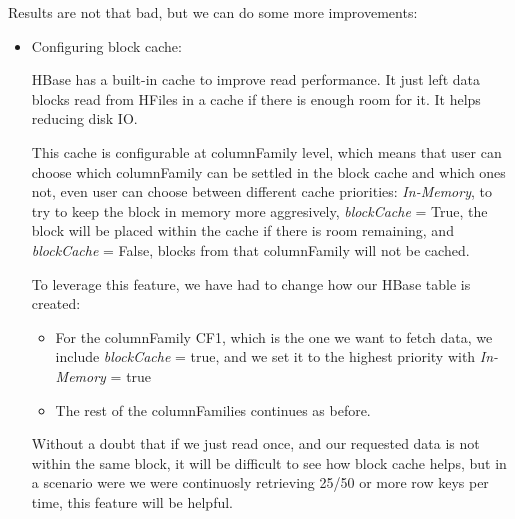 \bigskip

Results are not that bad, but we can do some more improvements:
\begin{itemize}
\item Configuring block cache:
\par 
HBase has a built-in cache to improve read performance. It just left data blocks read from HFiles in a cache if there is enough room for it. It helps reducing disk IO.
\par
 This cache is configurable at columnFamily level, which means that user can choose which columnFamily can be settled in the block cache and which ones not, even user can choose between different cache priorities: \textit{In-Memory}, to try to keep the block in memory more aggresively, \textit{blockCache} = True, the block will be placed within the cache if there is room remaining, and \textit{blockCache} = False, blocks from that columnFamily will not be cached.
\par 
To leverage this feature, we have had to change how our HBase table is created: 
\begin{itemize}
\item For the columnFamily CF1, which is the one we want to fetch data, we include \textit{blockCache} = true, and we set it to the highest priority with \textit{In-Memory} = true
\item The rest of the columnFamilies continues as before.
\end{itemize}

Without a doubt that if we just read once, and our requested data is not within the same block, it will be difficult to see how block cache helps, but in a scenario were we were continuosly retrieving 25/50 or more row keys per time, this feature will be helpful.




\end{itemize}
